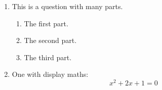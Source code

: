 \begin{enumerate}
    \item This is a question with many parts.
        \begin{enumerate}
            \item The first part.
            \item The second part.
            \item The third part.
        \end{enumerate}
    \item One with display maths:
        $$
            x^{2} + 2x + 1 = 0
        $$
\end{enumerate}
